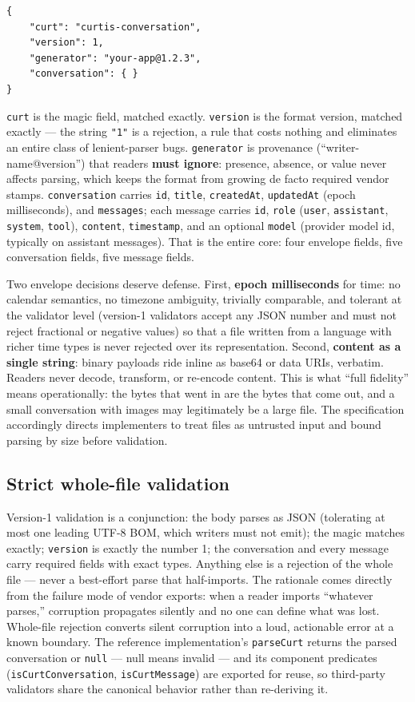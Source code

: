 \documentclass[11pt]{article}
\begin{document}
\begin{verbatim}
{
    "curt": "curtis-conversation",
    "version": 1,
    "generator": "your-app@1.2.3",
    "conversation": { }
}
\end{verbatim}

\texttt{curt} is the magic field, matched exactly. \texttt{version} is the format version, matched exactly --- the string \texttt{"1"} is a rejection, a rule that costs nothing and eliminates an entire class of lenient-parser bugs. \texttt{generator} is provenance (``writer-name@version'') that readers \textbf{must ignore}: presence, absence, or value never affects parsing, which keeps the format from growing de facto required vendor stamps. \texttt{conversation} carries \texttt{id}, \texttt{title}, \texttt{createdAt}, \texttt{updatedAt} (epoch milliseconds), and \texttt{messages}; each message carries \texttt{id}, \texttt{role} (\texttt{user}, \texttt{assistant}, \texttt{system}, \texttt{tool}), \texttt{content}, \texttt{timestamp}, and an optional \texttt{model} (provider model id, typically on assistant messages). That is the entire core: four envelope fields, five conversation fields, five message fields.

Two envelope decisions deserve defense. First, \textbf{epoch milliseconds} for time: no calendar semantics, no timezone ambiguity, trivially comparable, and tolerant at the validator level (version-1 validators accept any JSON number and must not reject fractional or negative values) so that a file written from a language with richer time types is never rejected over its representation. Second, \textbf{content as a single string}: binary payloads ride inline as base64 or data URIs, verbatim. Readers never decode, transform, or re-encode content. This is what ``full fidelity'' means operationally: the bytes that went in are the bytes that come out, and a small conversation with images may legitimately be a large file. The specification accordingly directs implementers to treat files as untrusted input and bound parsing by size before validation.

\subsection{Strict whole-file validation}

Version-1 validation is a conjunction: the body parses as JSON (tolerating at most one leading UTF-8 BOM, which writers must not emit); the magic matches exactly; \texttt{version} is exactly the number 1; the conversation and every message carry required fields with exact types. Anything else is a rejection of the whole file --- never a best-effort parse that half-imports. The rationale comes directly from the failure mode of vendor exports: when a reader imports ``whatever parses,'' corruption propagates silently and no one can define what was lost. Whole-file rejection converts silent corruption into a loud, actionable error at a known boundary. The reference implementation's \texttt{parseCurt} returns the parsed conversation or \texttt{null} --- null means invalid --- and its component predicates (\texttt{isCurtConversation}, \texttt{isCurtMessage}) are exported for reuse, so third-party validators share the canonical behavior rather than re-deriving it.
\end{document}
